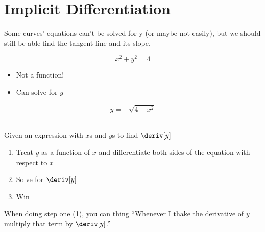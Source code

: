 
\section{Implicit Differentiation}
Some curves' equations can't be solved for y (or maybe not easily), but we should still be able find the tangent line and its slope.
\begin{example}
    \begin{equation*}
        x^2 + y^2 = 4
    \end{equation*}
    \begin{itemize}
        \item Not a function!
        \item Can solve for $y$
    \end{itemize}
    \begin{equation*}
        y = \pm \sqrt{4 - x^2}
    \end{equation*}
    \\
    Given an expression with $x$s and $y$s to find $\deriv[y]$
    \begin{enumerate}
        \item Treat $y$ as a function of $x$ and differentiate both sides of the equation with respect to $x$
        \item Solve for $\deriv[y]$
        \item Win
    \end{enumerate}
\end{example}
\begin{note}
    When doing step one (1), you can thing ``Whenever I thake the derivative of $y$ multiply that term by $\deriv[y]$.''
\end{note}
